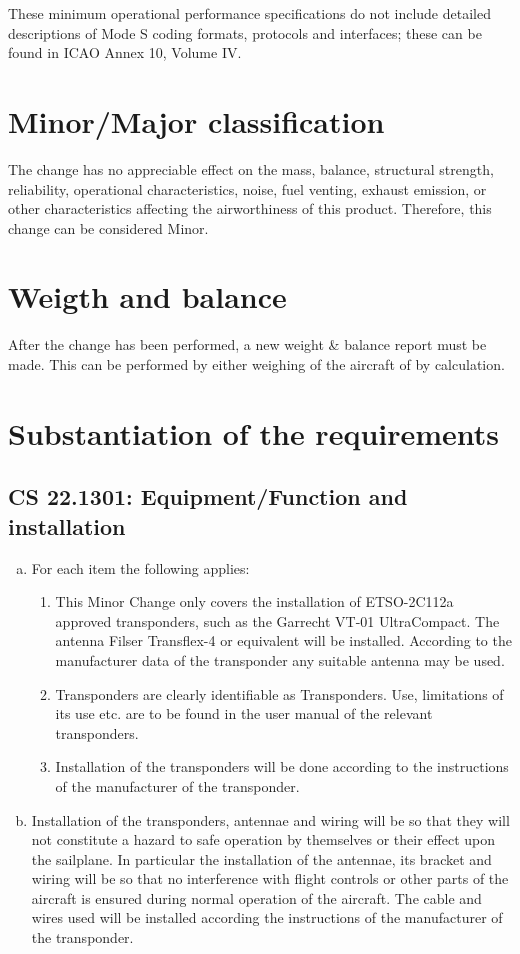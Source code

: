 \documentclass[twoside]{article}
\begin{document}
These minimum operational performance specifications do not include detailed descriptions of Mode S coding formats, protocols and interfaces; these can be found in ICAO Annex 10, Volume IV. 

\section{Minor/Major classification}
The change has no appreciable effect on the mass, balance, structural strength, reliability, operational characteristics, noise, fuel venting, exhaust emission, or other characteristics affecting the airworthiness of this product. Therefore, this change can be considered Minor.

\section{Weigth and balance}
After the change has been performed, a new weight \& balance report must be made. This can be performed by either weighing of the aircraft of by calculation.

\section{Substantiation of the requirements}

\subsection[CS 22.1301]{CS 22.1301:  Equipment/Function and installation}
\begin{enumerate}[(a)]
\item For each item the following applies:
\begin{enumerate}[(1)]
\item This Minor Change only covers the installation of ETSO-2C112a approved transponders, such as the Garrecht VT-01 UltraCompact. The antenna Filser Transflex-4 or equivalent will be installed. According to the manufacturer data of the transponder any suitable antenna may be used.
\item Transponders are clearly identifiable as Transponders. Use, limitations of its use etc. are to be found in the user manual of the relevant transponders.
\item Installation of the transponders will be done according to the instructions of the manufacturer of the transponder.
\end{enumerate}
\item Installation of the transponders, antennae and wiring will be so that they will not constitute a hazard to safe operation by themselves or their effect upon the sailplane. In particular the installation of the antennae, its bracket and wiring will be so that no interference with flight controls or other parts of the aircraft is ensured during normal operation of the aircraft. The cable and wires used will be installed according the instructions of the manufacturer of the transponder.
\end{enumerate}
\end{document}
